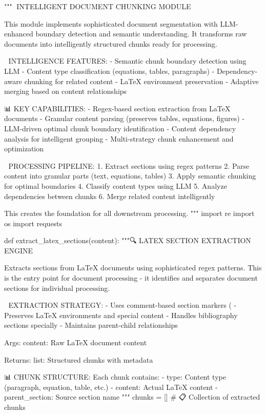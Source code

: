 """🔧 INTELLIGENT DOCUMENT CHUNKING MODULE

This module implements sophisticated document segmentation with LLM-enhanced
boundary detection and semantic understanding. It transforms raw documents
into intelligently structured chunks ready for processing.

🧠 INTELLIGENCE FEATURES:
- Semantic chunk boundary detection using LLM
- Content type classification (equations, tables, paragraphs)
- Dependency-aware chunking for related content
- LaTeX environment preservation
- Adaptive merging based on content relationships

📊 KEY CAPABILITIES:
- Regex-based section extraction from LaTeX documents
- Granular content parsing (preserves tables, equations, figures)
- LLM-driven optimal chunk boundary identification
- Content dependency analysis for intelligent grouping
- Multi-strategy chunk enhancement and optimization

🎯 PROCESSING PIPELINE:
1. Extract sections using regex patterns
2. Parse content into granular parts (text, equations, tables)
3. Apply semantic chunking for optimal boundaries
4. Classify content types using LLM
5. Analyze dependencies between chunks
6. Merge related content intelligently

This creates the foundation for all downstream processing.
"""
import re
import os
import requests

def extract_latex_sections(content):
    """🔍 LATEX SECTION EXTRACTION ENGINE
    
    Extracts sections from LaTeX documents using sophisticated regex patterns.
    This is the entry point for document processing - it identifies and
    separates document sections for individual processing.
    
    🎯 EXTRACTION STRATEGY:
    - Uses comment-based section markers (%
    - Preserves LaTeX environments and special content
    - Handles bibliography sections specially
    - Maintains parent-child relationships
    
    Args:
        content: Raw LaTeX document content
        
    Returns:
        list: Structured chunks with metadata
        
    📊 CHUNK STRUCTURE:
    Each chunk contains:
    - type: Content type (paragraph, equation, table, etc.)
    - content: Actual LaTeX content
    - parent_section: Source section name
    """
    chunks = []  # 📋 Collection of extracted chunks
    

